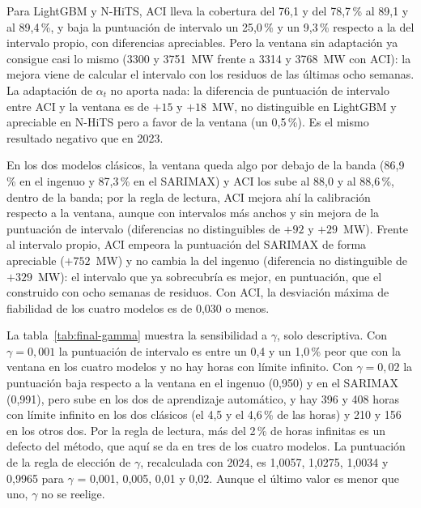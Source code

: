 Para LightGBM y N-HiTS, ACI lleva la cobertura del 76,1 y del 78,7\,\% al 89,1
y al 89,4\,\%, y baja la puntuación de intervalo un 25,0\,\% y un 9,3\,\%
respecto a la del intervalo propio, con diferencias apreciables. Pero la ventana
sin adaptación ya consigue casi lo mismo (3300 y 3751~MW frente a 3314 y
3768~MW con ACI): la mejora viene de calcular el intervalo con los residuos de
las últimas ocho semanas. La adaptación de $\alpha_t$ no aporta nada: la
diferencia de puntuación de intervalo entre ACI y la ventana es de $+15$ y
$+18$~MW, no distinguible en LightGBM y apreciable en N-HiTS pero a favor de la
ventana (un 0,5\,\%). Es el mismo resultado negativo que en 2023.

En los dos modelos clásicos, la ventana queda algo por debajo de la banda
(86,9\,\% en el ingenuo y 87,3\,\% en el SARIMAX) y ACI los sube al 88,0 y al
88,6\,\%, dentro de la banda; por la regla de lectura, ACI mejora ahí la
calibración respecto a la ventana, aunque con intervalos más anchos y sin mejora
de la puntuación de intervalo (diferencias no distinguibles de $+92$ y $+29$~MW).
Frente al intervalo propio, ACI empeora la puntuación del SARIMAX de forma
apreciable ($+752$~MW) y no cambia la del ingenuo (diferencia no distinguible de
$+329$~MW): el intervalo que ya sobrecubría es mejor, en puntuación, que el
construido con ocho semanas de residuos. Con ACI, la desviación máxima de
fiabilidad de los cuatro modelos es de 0,030 o menos.

La tabla~\ref{tab:final-gamma} muestra la sensibilidad a $\gamma$, solo
descriptiva. Con $\gamma = 0{,}001$ la puntuación de intervalo es entre un 0,4 y un
1,0\,\% peor que con la ventana en los cuatro modelos y no hay horas con límite
infinito. Con $\gamma = 0{,}02$ la puntuación baja respecto a la ventana en el
ingenuo (0,950) y en el SARIMAX (0,991), pero sube en los dos de aprendizaje
automático, y hay 396 y 408 horas con límite infinito en los dos clásicos
(el 4,5 y el 4,6\,\% de las horas) y 210 y 156 en los otros dos. Por la regla de
lectura, más del 2\,\% de horas infinitas es un defecto del método, que aquí
se da en tres de los cuatro modelos. La puntuación de la regla de elección de
$\gamma$, recalculada con 2024, es 1,0057, 1,0275, 1,0034 y 0,9965 para
$\gamma$ = 0,001, 0,005, 0,01 y 0,02. Aunque el último valor es menor que uno,
$\gamma$ no se reelige.

